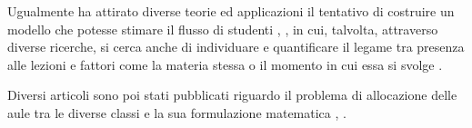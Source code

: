Ugualmente ha attirato diverse teorie ed applicazioni il tentativo di costruire
un modello che potesse stimare il flusso di studenti \cite{Sha99},
\cite{Blerkom1992}, in cui, talvolta, attraverso 
diverse ricerche, si cerca anche di individuare e quantificare il legame tra presenza alle 
lezioni e fattori come la materia stessa o il momento in cui essa si svolge \cite{Fjortoft2005}.

Diversi articoli sono poi stati pubblicati riguardo il problema di allocazione delle aule
tra le diverse classi e la sua formulazione matematica \cite{Ola19}, 
\cite{Gosselin1986} \cite{KanjanaThongsanit2014} \cite{Carter1992}
\cite{Phillips2015}.

